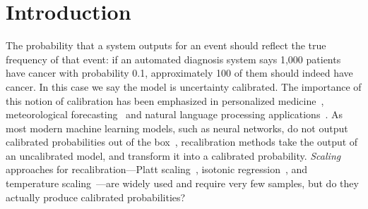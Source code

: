 \section{Introduction}

The probability that a system outputs for an event should reflect the true frequency of that event: if an automated diagnosis system says 1,000 patients have cancer with probability 0.1, approximately 100 of them should indeed have cancer.
In this case we say the model is uncertainty calibrated. The importance of this notion of calibration has been emphasized in personalized medicine~\cite{jiang2012calibrating}, meteorological forecasting~\cite{murphy1973vector, murphy1977reliability, degroot1983forecasters,gneiting2005weather, brocker2009decomposition} and natural language processing applications~\cite{nguyen2015posterior, card2018calibration}.
As most modern machine learning models, such as neural networks, do not output calibrated probabilities out of the box~\cite{guo2017calibration, zadrozny2001calibrated, kuleshov2018accurate}, recalibration methods take the output of an uncalibrated model, and transform it into a calibrated probability.
\emph{Scaling} approaches for recalibration---Platt scaling~\cite{platt1999probabilistic}, isotonic regression~\cite{zadrozny2002transforming}, and temperature scaling~\cite{guo2017calibration}---are widely used and require very few samples, but do they actually produce calibrated probabilities?

